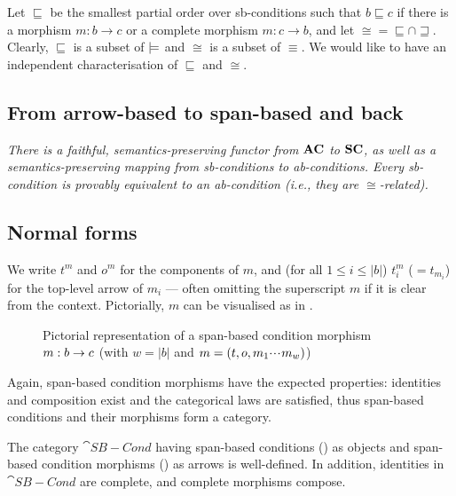 Let $\sqsubseteq$ be the smallest partial order over sb-conditions such that $b\sqsubseteq c$ if there is a morphism $m:b\to c$ or a complete morphism $m:c\to b$, and let ${\cong}={\sqsubseteq}\cap {\sqsupseteq}$. Clearly, $\sqsubseteq$ is a subset of $\models$ and $\cong$ is a subset of $\equiv$. We would like to have an independent characterisation of $\sqsubseteq$ and $\cong$.

\subsection{From arrow-based to span-based and back}

\emph{There is a faithful, semantics-preserving functor from $\mathbf{AC}$ to $\mathbf{SC}$, as well as a semantics-preserving mapping from sb-conditions to ab-conditions. Every sb-condition is provably equivalent to an ab-condition (i.e., they are $\cong$-related).}

\subsection{Normal forms}


%
\begin{center}

\end{center}
%
We write $t^m$ and $o^m$ for the components of $m$, and (for all $1\leq i\leq |b|$) $t^m_i$ ($=t_{m_i}$) for the top-level arrow of $m_i$ --- often omitting the superscript $m$ if it is clear from the context. Pictorially, $m$ can be visualised as in .
%
\begin{figure}
  \centering
  
  \caption{Pictorial representation of a span-based condition morphism $m:b\rightarrow c$ (with $w=|b|$ and $m=(t,o,m_1{\cdotp\mkern-2mu\cdotp\mkern-2mu\cdotp\mkern1mu} m_w)$)}
\end{figure}

\medskip\noindent Again, span-based condition morphisms have the expected properties: identities and composition exist and the categorical laws are satisfied, thus span-based conditions and their morphisms form a category.

\begin{proposition}
  The category $\cat{SB-Cond}$ having span-based conditions () as objects and span-based condition morphisms () as arrows is well-defined. In addition, identities in $\cat{SB-Cond}$ are complete, and complete morphisms compose.
\end{proposition}
 
